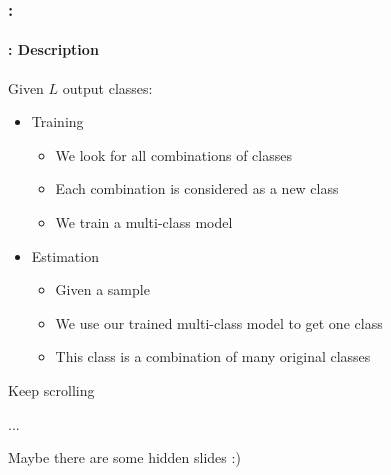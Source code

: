 \documentclass[xcolor=table]{beamer}
\begin{document}
\begin{frame}
	\frametitle{\insertshortsubtitle: \insertsection}
	\framesubtitle{\insertsubsection: Description}
	
	Given $L$ output classes:
	\begin{itemize}
		\item Training
		\begin{itemize}
			\item We look for all combinations of classes
			\item Each combination is considered as a new class
			\item We train a multi-class model
		\end{itemize}
		\item Estimation
		\begin{itemize}
			\item Given a sample
			\item We use our trained multi-class model to get one class
			\item This class is a combination of many original classes
		\end{itemize}
	\end{itemize}
	
\end{frame}


\begin{frame}[plain]
	
	\begin{center}
		\Huge 
		Keep scrolling
		
		... 
		
		Maybe there are some hidden slides :)
	\end{center}
	
\end{frame}
\end{document}
